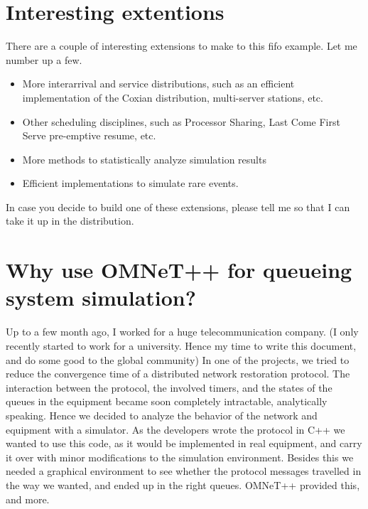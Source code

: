 \documentclass[a4paper]{article}
\begin{document}
\section{Interesting extentions}
\label{sec:inter-extent}
There are a couple of interesting extensions to make to this fifo
example. Let me number up a few.
\begin{itemize}
\item More interarrival and service distributions, such as an efficient
  implementation of the Coxian distribution, multi-server stations, etc.
\item Other scheduling disciplines, such as Processor Sharing, Last Come First
Serve pre-emptive resume, etc.
\item More methods to statistically analyze simulation results
\item Efficient implementations to simulate rare events.
\end{itemize}
In case you decide to build one of these extensions, please tell me so
that I can take it up in the distribution.

\section{Why use OMNeT++ for queueing system simulation?}
\label{sec:why-use-omnet++}
Up to a few month ago, I worked for a huge telecommunication
company. (I only recently started to work for a university. Hence my
time to write this document, and do some good to the global community)  In
one of the projects, we tried to reduce the convergence
time of a distributed network restoration protocol. The interaction
between the protocol, the involved timers, and the states of the
queues in the equipment became soon completely intractable,
analytically speaking.  Hence we decided to analyze the behavior of
the  network and equipment with a  simulator. As the developers wrote the
protocol  in C++ we wanted to use this  code, as it would be
implemented in real  equipment, and carry it over with minor modifications
 to the simulation environment. Besides this we needed a graphical
environment to see whether the protocol messages travelled in the way
we wanted, and ended up in the right queues. OMNeT++ provided this,
and more.
\end{document}
